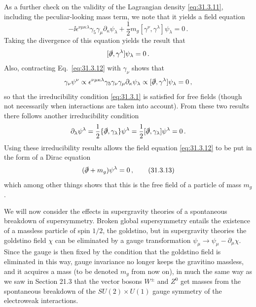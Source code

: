 As a further check on the validity of the Lagrangian density
\eqref{eq:31.3.11}, including the peculiar-looking mass term, we note that
it yields a field equation
\begin{equation}
  -\ii\epsilon^{\nu\mu\kappa\lambda}\gamma_5\gamma_\mu
  \partial_\kappa\psi_\lambda
  +\frac12m_g[\gamma^\nu,\gamma^\lambda]\psi_\lambda=0\,.
  \tag{31.3.12}\label{eq:31.3.12}
\end{equation}
Taking the divergence of this equation yields the result that
\[
  [\sl{\partial},\gamma^\lambda]\psi_\lambda=0\,.
\]
Also, contracting Eq.~\eqref{eq:31.3.12} with \(\gamma_\nu\) shows that
\[
  \gamma_\nu\psi^\nu
  \propto\epsilon^{\nu\mu\kappa\lambda}
  \gamma_5\gamma_\nu\gamma_\mu\partial_\kappa\psi_\lambda
  \propto[\sl{\partial},\gamma^\lambda]\psi_\lambda=0\,,
\]
so that the irreducibility condition \eqref{eq:31.3.1} is satisfied for
free fields (though not necessarily when interactions are taken into
account). From these two results there follows another irreducibility
condition
\[
  \partial_\lambda\psi^\lambda
  =\frac12\{\sl{\partial},\gamma_\lambda\}\psi^\lambda
  =\frac12[\sl{\partial},\gamma_\lambda]\psi^\lambda=0\,.
\]
Using these irreducibility results allows the field equation
\eqref{eq:31.3.12} to be put in the form of a Dirac equation
\begin{equation}
  (\sl{\partial}+m_g)\psi^\lambda=0\,,
  \tag{31.3.13}\label{eq:31.3.13}
\end{equation}
which among other things shows that this is the free field of a particle
of mass \(m_g\).

We will now consider the effects in supergravity theories of a spontaneous
breakdown of supersymmetry. Broken global supersymmetry entails the
existence of a massless particle of spin \(1/2\), the goldstino, but in
supergravity theories the goldstino field \(\chi\) can be eliminated by a
gauge transformation
\(\psi_\mu\to\psi_\mu-\partial_\mu\chi\). Since the gauge is then fixed by
the condition that the goldstino field is eliminated in this way, gauge
invariance no longer keeps the gravitino massless, and it acquires a mass
(to be denoted \(m_g\) from now on), in much the same way as we saw in
Section 21.3 that the vector bosons \(W^\pm\) and \(Z^0\) get masses from
the spontaneous breakdown of the
\(SU(2)\times U(1)\) gauge symmetry of the electroweak interactions.

